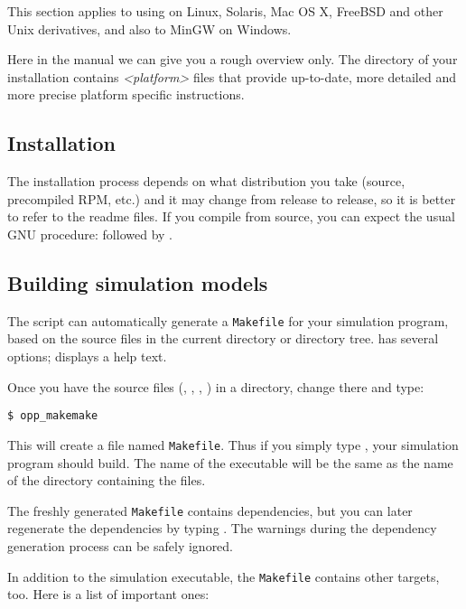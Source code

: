This section applies to using {\opp} on Linux, Solaris, Mac OS X, FreeBSD and
other Unix derivatives, and also to MinGW on Windows.

Here in the manual we can give you a rough overview only.
The  directory of your {\opp} installation contains
\textit{<platform>} files that provide
up-to-date, more detailed and more precise platform specific
instructions.


\subsection{Installation}

The installation process depends on what distribution you take
(source, precompiled RPM, etc.) and it may change from release
to release, so it is better to refer to the readme files.
If you compile from source, you can expect the usual GNU
procedure:  followed by .


\subsection{Building simulation models}

The  script can automatically generate a
\texttt{Makefile} for your simulation program, based on the source files
in the current directory or directory tree.
 has several options; 
displays a help text.

Once you have the source files (, , ,
) in a directory, change there and type:

\begin{verbatim}
$ opp_makemake
\end{verbatim}

This will create a file named \texttt{Makefile}. Thus if you
simply type , your simulation program should build. The name of
the executable will be the same as the name of the directory
containing the files.


The freshly generated \texttt{Makefile} contains
dependencies, but you can later
regenerate the dependencies by typing .
The warnings during the dependency generation process can
be safely ignored.

In addition to the simulation executable, the \texttt{Makefile}
contains other targets, too. Here is a list of important ones:

